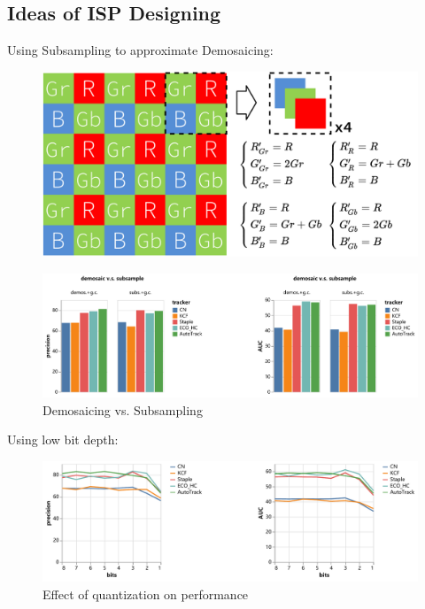 \documentclass{beamer}
\begin{document}
\subsection{Ideas of ISP Designing}

\begin{frame}
    Using Subsampling to approximate Demosaicing:
    \begin{figure}[htpb]
        \begin{center}
            \includegraphics[width=0.6\linewidth]{fig/isp_dem_1.pdf}
        \end{center}
    \end{figure}
\end{frame}

\begin{frame}
    \begin{figure}[htpb]
        \begin{center}
            \includegraphics[width=0.8\linewidth]{fig/isp_dem_2.pdf}
            \caption{Demosaicing vs. Subsampling}
        \end{center}
    \end{figure}
\end{frame}

\begin{frame}
    Using low bit depth:
    \begin{figure}[htpb]
        \begin{center}
            \includegraphics[width=0.75\linewidth]{fig/bits.pdf}
            \caption{Effect of quantization on performance}
        \end{center}
    \end{figure}
\end{frame}
\end{document}
